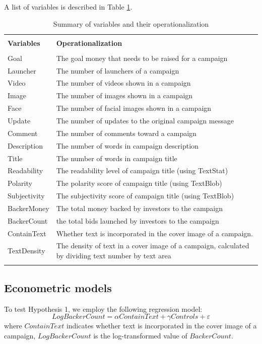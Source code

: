 \documentclass[a4paper]{article}
\begin{document}
A list of variables is described in Table \ref{tab:Vairalbes}. 
\begin{table}
    \centering
    \caption{Summary of variables and their operationalization}
    \label{tab:Vairalbes}

    \begin{tabular}{lp{}}
    \\[-1.8ex]\hline 
\hline \\[-1.8ex] 
\bf Variables & \bf Operationalization \\
\hline \\[-1.8ex] 
Goal & The goal money that needs to be raised for a campaign \\
Launcher & The number of launchers of a campaign \\
Video         & The number of videos shown in a campaign\\
Image         & The number of images shown in a campaign\\
Face         & The number of facial images shown in a campaign \\
Update         & The number of updates to the original campaign message\\
Comment         & The number of comments toward a campaign\\
Description  &  The number of words in campaign description\\
Title & The number of words in campaign title \\
Readability & The readability level of campaign title (using TextStat) \\
Polarity & The polarity score of campaign title (using TextBlob) \\
Subjectivity & The subjectivity score of campaign title (using TextBlob) \\
BackerMoney & The total money backed by investors to the campaign \\
BackerCount & the total bids launched by investors to the campaign \\
ContainText & Whether text is incorporated in the cover image of a campaign. \\
TextDensity & The density of text in a cover image of a campaign, 
calculated by dividing text number by text area \\
\hline
    \hline \\[-1.8ex] 
    \end{tabular}
\end{table}

\subsection{Econometric models}
To test Hypothesis 1, we employ the following regression model:
\begin{equation}
    LogBackerCount = \alpha ContainText + \gamma Controls + \varepsilon
\end{equation}
where $ContainText$ indicates whether text is incorporated in the cover image of a campaign, $LogBackerCount$ is the log-transformed value of $BackerCount$. 
\end{document}
